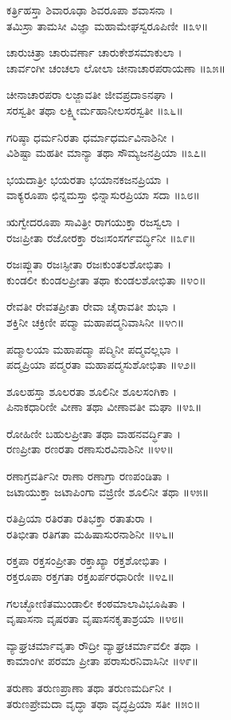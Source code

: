 ಕರ್ತ್ರಿಹಸ್ತಾ ಶಿವಾರೂಢಾ ಶಿವರೂಪಾ ಶವಾಸನಾ ।\\
ತಮಿಸ್ರಾ ತಾಮಸೀ ವಿಜ್ಞಾ ಮಹಾಮೇಘಸ್ವರೂಪಿಣೀ ॥೩೪॥

ಚಾರುಚಿತ್ರಾ ಚಾರುವರ್ಣಾ ಚಾರುಕೇಶಸಮಾಕುಲಾ ।\\
ಚಾರ್ವಂಗೀ ಚಂಚಲಾ ಲೋಲಾ ಚೀನಾಚಾರಪರಾಯಣಾ ॥೩೫॥

ಚೀನಾಚಾರಪರಾ ಲಜ್ಜಾವತೀ ಜೀವಪ್ರದಾಽನಘಾ ।\\
ಸರಸ್ವತೀ ತಥಾ ಲಕ್ಷ್ಮೀರ್ಮಹಾನೀಲಸರಸ್ವತೀ ॥೩೬॥

ಗರಿಷ್ಠಾ ಧರ್ಮನಿರತಾ ಧರ್ಮಾಧರ್ಮವಿನಾಶಿನೀ ।\\
ವಿಶಿಷ್ಟಾ ಮಹತೀ ಮಾನ್ಯಾ ತಥಾ ಸೌಮ್ಯಜನಪ್ರಿಯಾ ॥೩೭॥

ಭಯದಾತ್ರೀ ಭಯರತಾ ಭಯಾನಕಜನಪ್ರಿಯಾ ।\\
ವಾಕ್ಯರೂಪಾ ಛಿನ್ನಮಸ್ತಾ ಛಿನ್ನಾಸುರಪ್ರಿಯಾ ಸದಾ ॥೩೮॥

ಋಗ್ವೇದರೂಪಾ ಸಾವಿತ್ರೀ ರಾಗಯುಕ್ತಾ ರಜಸ್ವಲಾ ।\\
ರಜಃಪ್ರೀತಾ ರಜೋರಕ್ತಾ ರಜಃಸಂಸರ್ಗವರ್ದ್ಧಿನೀ ॥೩೯॥

ರಜಃಪ್ಲುತಾ ರಜಃಸ್ಫೀತಾ ರಜಃಕುಂತಲಶೋಭಿತಾ ।\\
ಕುಂಡಲೀ ಕುಂಡಲಪ್ರೀತಾ ತಥಾ ಕುಂಡಲಶೋಭಿತಾ ॥೪೦॥

ರೇವತೀ ರೇವತಪ್ರೀತಾ ರೇವಾ ಚೈರಾವತೀ ಶುಭಾ ।\\
ಶಕ್ತಿನೀ ಚಕ್ರಿಣೀ ಪದ್ಮಾ ಮಹಾಪದ್ಮನಿವಾಸಿನೀ ॥೪೧॥

ಪದ್ಮಾಲಯಾ ಮಹಾಪದ್ಮಾ ಪದ್ಮಿನೀ ಪದ್ಮವಲ್ಲಭಾ ।\\
ಪದ್ಮಪ್ರಿಯಾ ಪದ್ಮರತಾ ಮಹಾಪದ್ಮಸುಶೋಭಿತಾ ॥೪೨॥

ಶೂಲಹಸ್ತಾ ಶೂಲರತಾ ಶೂಲಿನೀ ಶೂಲಸಂಗಿಕಾ ।\\
ಪಿನಾಕಧಾರಿಣೀ ವೀಣಾ ತಥಾ ವೀಣಾವತೀ ಮಘಾ ॥೪೩॥

ರೋಹಿಣೀ ಬಹುಲಪ್ರೀತಾ ತಥಾ ವಾಹನವರ್ದ್ಧಿತಾ ।\\
ರಣಪ್ರೀತಾ ರಣರತಾ ರಣಾಸುರವಿನಾಶಿನೀ ॥೪೪॥

ರಣಾಗ್ರವರ್ತಿನೀ ರಾಣಾ ರಣಾಗ್ರಾ ರಣಪಂಡಿತಾ ।\\
ಜಟಾಯುಕ್ತಾ ಜಟಾಪಿಂಗಾ ವಜ್ರಿಣೀ ಶೂಲಿನೀ ತಥಾ ॥೪೫॥

ರತಿಪ್ರಿಯಾ ರತಿರತಾ ರತಿಭಕ್ತಾ ರತಾತುರಾ ।\\
ರತಿಭೀತಾ ರತಿಗತಾ ಮಹಿಷಾಸುರನಾಶಿನೀ ॥೪೬॥

ರಕ್ತಪಾ ರಕ್ತಸಂಪ್ರೀತಾ ರಕ್ತಾಖ್ಯಾ ರಕ್ತಶೋಭಿತಾ ।\\
ರಕ್ತರೂಪಾ ರಕ್ತಗತಾ ರಕ್ತಖರ್ಪರಧಾರಿಣೀ ॥೪೭॥

ಗಲಚ್ಛೋಣಿತಮುಂಡಾಲೀ ಕಂಠಮಾಲಾವಿಭೂಷಿತಾ ।\\
ವೃಷಾಸನಾ ವೃಷರತಾ ವೃಷಾಸನಕೃತಾಶ್ರಯಾ ॥೪೮॥

ವ್ಯಾಘ್ರಚರ್ಮಾವೃತಾ ರೌದ್ರೀ ವ್ಯಾಘ್ರಚರ್ಮಾವಲೀ ತಥಾ ।\\
ಕಾಮಾಂಗೀ ಪರಮಾ ಪ್ರೀತಾ ಪರಾಸುರನಿವಾಸಿನೀ ॥೪೯॥

ತರುಣಾ ತರುಣಪ್ರಾಣಾ ತಥಾ ತರುಣಮರ್ದಿನೀ ।\\
ತರುಣಪ್ರೇಮದಾ ವೃದ್ಧಾ ತಥಾ ವೃದ್ಧಪ್ರಿಯಾ ಸತೀ ॥೫೦॥

